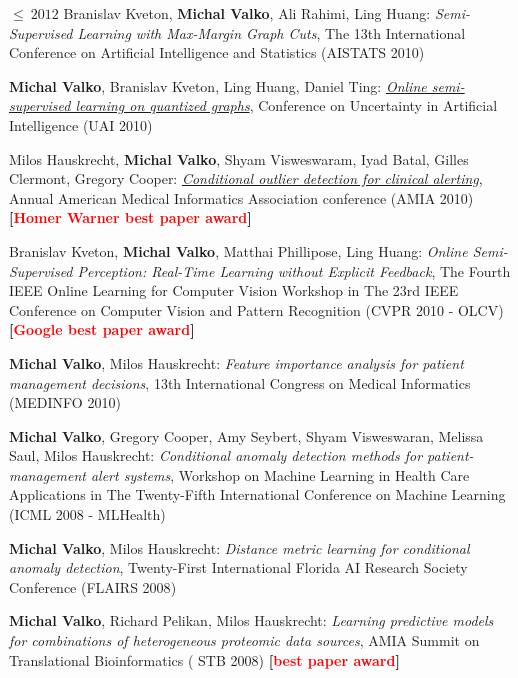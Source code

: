 \documentclass{resume}
\begin{document}
\begin{category}{$\leq\ 2012$}
\citembullet
Branislav Kveton, {\bf Michal Valko}, Ali Rahimi, Ling Huang:
\emph{Semi-Supervised Learning with Max-Margin Graph Cuts},
The 13th International Conference on Artificial Intelligence and Statistics
({\sf AISTATS 2010})

\citembullet    
{\bf Michal Valko}, Branislav Kveton, Ling Huang, Daniel Ting: 
\href{http://researchers.lille.inria.fr/~valko/hp/serve.php?what=publications/valko2010online.pdf}
{\emph{Online semi-supervised learning on quantized graphs}},
Conference on Uncertainty in Artificial Intelligence
({\sf UAI 2010})

\citembullet
Milos Hauskrecht, {\bf Michal Valko},  Shyam Visweswaram, Iyad Batal, Gilles Clermont, Gregory Cooper:
\href{http://researchers.lille.inria.fr/~valko/hp/serve.php?what=publications/hauskrecht2010conditional.pdf}
{\emph{Conditional outlier detection for clinical alerting}}, 
Annual American Medical Informatics
Association conference ({\sf AMIA 2010}) 
{\bf [\textcolor{red}{Homer Warner best paper award}]}


\citembullet
Branislav Kveton, {\bf Michal Valko}, Matthai Phillipose, Ling Huang:
\emph{Online Semi-Supervised Perception: Real-Time Learning without Explicit
Feedback},
The Fourth IEEE Online Learning for Computer Vision Workshop in The 23rd IEEE
Conference on Computer Vision and Pattern Recognition
({\sf CVPR 2010 - OLCV})  
{\bf [\textcolor{red}{Google best paper award}]}

\citembullet
{\bf Michal Valko}, Milos Hauskrecht:
\emph{Feature importance analysis for patient management decisions}, 
13th International Congress on Medical Informatics ({\sf MEDINFO 2010})

\citembullet
{\bf Michal Valko}, Gregory Cooper, Amy Seybert, Shyam Visweswaran, Melissa Saul, Milos Hauskrecht:
\emph{Conditional anomaly detection methods for patient-management alert systems}, Workshop on
Machine Learning in Health Care Applications in The Twenty-Fifth International Conference on
Machine Learning ({\sf ICML 2008 - MLHealth})

\citembullet    
{\bf Michal Valko}, Milos Hauskrecht: \emph{Distance metric learning for conditional anomaly detection},
Twenty-First International Florida AI Research Society Conference ({\sf FLAIRS 2008})

\citembullet    
{\bf Michal Valko},  Richard Pelikan, Milos Hauskrecht: \emph{Learning predictive models for combinations of heterogeneous
proteomic data sources}, AMIA Summit on Translational Bioinformatics ({\sf
      STB 2008}) 
      {\bf [\textcolor{red}{best paper award}]}



\end{category}
\end{document}
